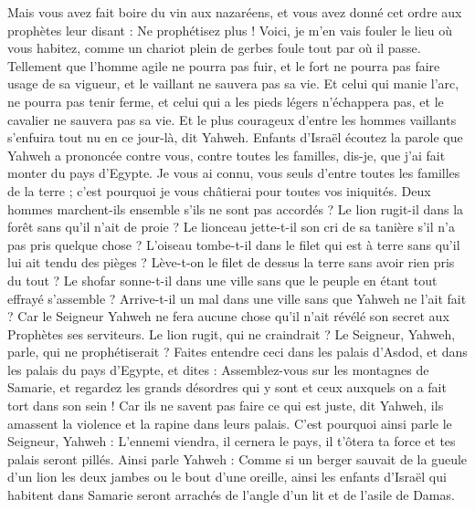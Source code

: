 \begin{multicols}{2}
Mais vous avez fait boire du vin aux nazaréens, et vous avez donné cet ordre aux prophètes leur disant : Ne prophétisez plus !
Voici, je m'en vais fouler le lieu où vous habitez, comme un chariot plein de gerbes foule tout par où il passe.
Tellement que l'homme agile ne pourra pas fuir, et le fort ne pourra pas faire usage de sa vigueur, et le vaillant ne sauvera pas sa vie.
Et celui qui manie l'arc, ne pourra pas tenir ferme, et celui qui a les pieds légers n'échappera pas, et le cavalier ne sauvera pas sa vie.
Et le plus courageux d'entre les hommes vaillants s'enfuira tout nu en ce jour-là, dit Yahweh.
\VerseOne{}Enfants d'Israël écoutez la parole que Yahweh a prononcée contre vous, contre toutes les familles, dis-je, que j'ai fait monter du pays d'Egypte.
Je vous ai connu, vous seuls d'entre toutes les familles de la terre ; c'est pourquoi je vous châtierai pour toutes vos iniquités.
Deux hommes marchent-ils ensemble s'ils ne sont pas accordés ?
Le lion rugit-il dans la forêt sans qu'il n'ait de proie ? Le lionceau jette-t-il son cri de sa tanière s'il n'a pas pris quelque chose ?
L'oiseau tombe-t-il dans le filet qui est à terre sans qu'il lui ait tendu des pièges ? Lève-t-on le filet de dessus la terre sans avoir rien pris du tout ?
Le shofar sonne-t-il dans une ville sans que le peuple en étant tout effrayé s'assemble ? Arrive-t-il un mal dans une ville sans que Yahweh ne l'ait fait ?
Car le Seigneur Yahweh ne fera aucune chose qu'il n'ait révélé son secret aux Prophètes ses serviteurs. 
Le lion rugit, qui ne craindrait ? Le Seigneur, Yahweh, parle, qui ne prophétiserait ?
Faites entendre ceci dans les palais d'Asdod, et dans les palais du pays d'Egypte, et dites : Assemblez-vous sur les montagnes de Samarie, et regardez les grands désordres qui y sont et ceux auxquels on a fait tort dans son sein !
Car ils ne savent pas faire ce qui est juste, dit Yahweh, ils amassent la violence et la rapine dans leurs palais.
C'est pourquoi ainsi parle le Seigneur, Yahweh : L'ennemi viendra, il cernera le pays, il t'ôtera ta force et tes palais seront pillés.
Ainsi parle Yahweh : Comme si un berger sauvait de la gueule d'un lion les deux jambes ou le bout d'une oreille, ainsi les enfants d'Israël qui habitent dans Samarie seront arrachés de l'angle d'un lit et de l'asile de Damas.

\end{multicols}
